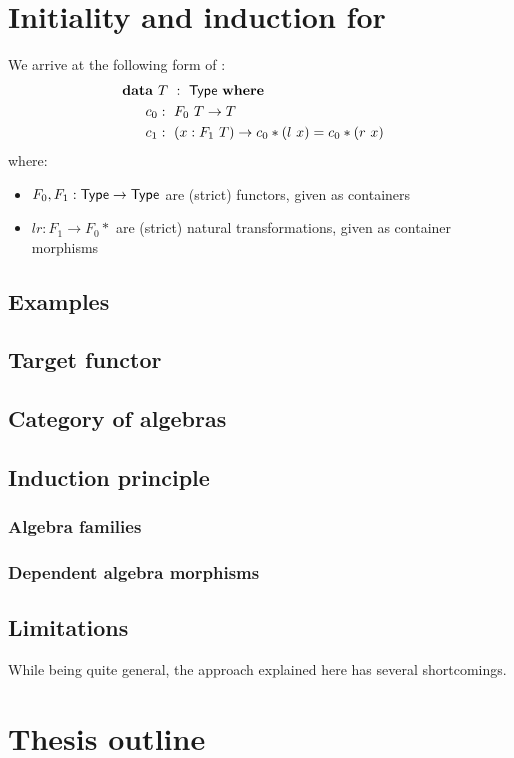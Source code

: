 \documentclass[a4paper,10pt]{article}
\begin{document}
\section{Initiality and induction for \onehits}
\label{sec:onehits}



We arrive at the following form of \hits:
%
\begin{alignat*}{2}
  &\rlap{$\data\ T\ :\ \Type\ \where$} \\
  &&\ \ c_0  &:\ F_0\ T \to T \\
  &&\ \ c_1  &:\ (x : F_1\ T) \to c_0 * (l\ x) = c_0 * (r\ x)
\end{alignat*}
%
where:
\begin{itemize}
\item $F_0, F_1 : \mathsf{Type} \to \mathsf{Type}$ are (strict) functors, given as containers
\item $l r : F_1 \to F_0 *$ are (strict) natural transformations, given as container morphisms
\end{itemize}

\subsection{Examples}


\subsection{Target functor}

\subsection{Category of algebras}

\subsection{Induction principle}

\subsubsection{Algebra families}

\subsubsection{Dependent algebra morphisms}

\subsection{Limitations}

While being quite general, the approach explained here has several shortcomings.

\section{Thesis outline}
\label{sec:outline}




\end{document}
